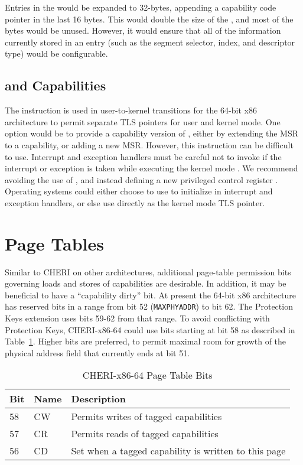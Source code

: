 Entries in the \IDT{} would be expanded to 32-bytes, appending a capability
code pointer in the last 16 bytes.  This would double the size of the
\IDT{}, and most of the bytes would be unused.  However, it would
ensure that all of the information currently stored in an \IDT{} entry
(such as the segment selector, \IST{} index, and descriptor type) would
be configurable.

\subsection{ and Capabilities}

The  instruction is used in user-to-kernel
transitions for the 64-bit x86 architecture to permit separate TLS
pointers for user and kernel mode.  One option would be to provide a
capability version of , either by extending the
\KGSBASE{} MSR to a capability, or adding a new MSR.  However, this
instruction can be difficult to use.  Interrupt and exception handlers
must be careful not to invoke  if the interrupt
or exception is taken while executing the kernel mode \GS{}.  We
recommend avoiding the use of , and instead defining
a new privileged control register \KGS{}.  Operating systems could
either choose to use \KGS{} to initialize \CGS{} in interrupt and
exception handlers, or else use \KGS{} directly as the kernel mode TLS
pointer.

\section{Page Tables}

Similar to CHERI on other architectures, additional page-table
permission bits governing loads and stores of capabilities are
desirable.  In addition, it may be beneficial to have a ``capability
dirty'' bit.  At present the 64-bit x86 architecture has reserved bits
in a range from bit 52 (\texttt{MAXPHYADDR}) to bit 62.  The Protection Keys
extension uses bits 59-62 from that range.  To avoid conflicting with
Protection Keys, CHERI-x86-64 could use bits starting at bit 58 as described in Table~\ref{table:x86:pte}.  Higher bits are
preferred, to permit maximal room for growth of the physical address
field that currently ends at bit 51.

\begin{table}
\begin{center}
\begin{tabular}{lll}
\toprule
Bit & Name & Description \\
\midrule
58 & CW & Permits writes of tagged capabilities \\
57 & CR & Permits reads of tagged capabilities \\
56 & CD & Set when a tagged capability is written to this page \\
\bottomrule
\end{tabular}
\end{center}
\caption{CHERI-x86-64 Page Table Bits}
\label{table:x86:pte}
\end{table}

